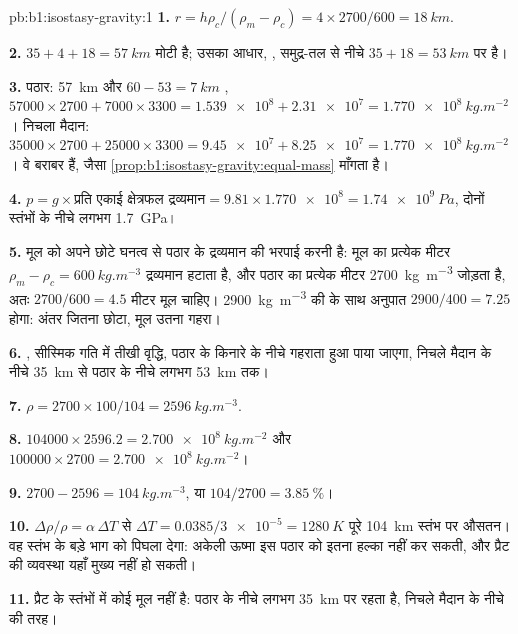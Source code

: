 \begin{solution}{pb:b1:isostasy-gravity:1}
\textbf{1.} $r = h\rho_c/(\rho_m - \rho_c) = 4\times2700/600 = \qty{18}{km}$.

\textbf{2.}  $35 + 4 + 18 = \qty{57}{km}$ मोटी है; उसका आधार, , समुद्र-तल से नीचे $35 + 18 = \qty{53}{km}$ पर है।

\textbf{3.} पठार: \qty{57}{km}  और $60 - 53 = \qty{7}{km}$ , $\num{57000}\times2700 + \num{7000}\times3300 = \num{1.539e8} + \num{2.31e7} =
\qty{1.770e8}{kg.m^{-2}}$। निचला मैदान: $\num{35000}\times2700 + \num{25000}\times3300
= \num{9.45e7} + \num{8.25e7} = \qty{1.770e8}{kg.m^{-2}}$। वे बराबर हैं, जैसा \cref{prop:b1:isostasy-gravity:equal-mass} माँगता है।

\textbf{4.} $p = g\times\text{प्रति एकाई क्षेत्रफल द्रव्यमान} = 9.81\times\num{1.770e8} =
\qty{1.74e9}{Pa}$, दोनों स्तंभों के नीचे लगभग \qty{1.7}{GPa}।

\textbf{5.} मूल को अपने छोटे घनत्व से पठार के द्रव्यमान की भरपाई करनी है: मूल का प्रत्येक मीटर $\rho_m - \rho_c = \qty{600}{kg.m^{-3}}$ द्रव्यमान हटाता है, और पठार का प्रत्येक मीटर \qty{2700}{kg.m^{-3}} जोड़ता है, अतः $2700/600 = 4.5$ मीटर मूल चाहिए। \qty{2900}{kg.m^{-3}} की  के साथ अनुपात $2900/400 = 7.25$ होगा: अंतर जितना छोटा, मूल उतना गहरा।

\textbf{6.} , सीस्मिक गति में तीखी वृद्धि, पठार के किनारे के नीचे गहराता हुआ पाया जाएगा, निचले मैदान के नीचे \qty{35}{km} से पठार के नीचे लगभग \qty{53}{km} तक।

\textbf{7.} $\rho = 2700\times100/104 = \qty{2596}{kg.m^{-3}}$.

\textbf{8.} $\num{104000}\times2596.2 = \qty{2.700e8}{kg.m^{-2}}$ और
$\num{100000}\times2700 = \qty{2.700e8}{kg.m^{-2}}$।

\textbf{9.} $2700 - 2596 = \qty{104}{kg.m^{-3}}$, या $104/2700 =
\qty{3.85}{\percent}$।

\textbf{10.} $\Delta\rho/\rho = \alpha\,\Delta T$ से $\Delta T =
0.0385/\num{3e-5} = \qty{1280}{K}$ पूरे \qty{104}{km} स्तंभ पर औसतन। वह स्तंभ के बड़े भाग को पिघला देगा: अकेली ऊष्मा इस पठार को इतना हल्का नहीं कर सकती, और प्रैट की व्यवस्था यहाँ मुख्य नहीं हो सकती।

\textbf{11.} प्रैट के स्तंभों में कोई मूल नहीं है:  पठार के नीचे लगभग \qty{35}{km} पर रहता है, निचले मैदान के नीचे की तरह।


\end{solution}
